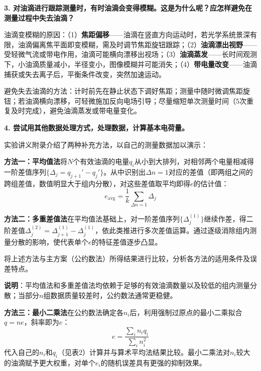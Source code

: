 \documentclass[a4paper,12pt]{article}
\begin{document}
{\vspace{0.5cm}

\textbf{3. 对油滴进行跟踪测量时，有时油滴会变得模糊。这是为什么呢？应怎样避免在测量过程中失去油滴？}

\vspace{0.2cm}

油滴变模糊的原因：（1）\textbf{焦距偏移}——油滴在竖直方向运动时，若光学系统景深有限，油滴偏离焦平面即变模糊，需及时调节焦距旋钮跟踪；（2）\textbf{油滴漂出视野}——受轻微气流或带电作用，油滴可能横向漂移出视场；（3）\textbf{油滴蒸发}——长时间观测下，小油滴质量减小，半径变小，图像模糊并可能消失；（4）\textbf{带电量改变}——油滴捕获或失去离子后，平衡条件改变，突然加速运动。

避免失去油滴的方法：计时前先在静止状态下调好焦距；测量中随时微调焦距旋钮；若油滴横向漂移，可轻微施加反向电场引导；尽量缩短单次测量时间（5次重复及时完成），避免油滴蒸发或带电量变化。

\vspace{0.5cm}

\textbf{4. 尝试用其他数据处理方式，处理数据，计算基本电荷量。}

\vspace{0.2cm}

实验讲义附录介绍了两种补充方法，以自己的测量数据加以演示：

\textbf{方法一：平均值法}\quad 将$N$个有效油滴的电量$q_i$从小到大排列，对相邻两个电量相减得一阶差值序列$\{\Delta_j = q_{j+1}' - q_j'\}$。从中识别出$\Delta n = 1$对应的差值（即两组之间的跨组差值，数值明显大于组内分散），对这些差值取平均即得$e$的估计值：
\[
e_{\text{avg}} = \frac{1}{k}\sum_{\Delta n=1} \Delta_j
\]

\textbf{方法二：多重差值法}\quad 在平均值法基础上，对一阶差值序列$\{\Delta_j^{(1)}\}$继续作差，得二阶差值$\Delta_j^{(2)} = \Delta_{j+1}^{(1)} - \Delta_j^{(1)}$，依此类推进行多次差值运算。通过逐级消除组内测量分散的影响，使代表单个$e$的特征差值逐步凸显。

将上述方法与主方案（公约数法）所得结果进行比较，分析各方法的适用条件及误差特点。

\textbf{说明}：平均值法和多重差值法均依赖于足够的有效油滴数量以及较低的组内测量分散；当部分$n$组数据质量较差时，公约数法通常更稳健。

\textbf{方法三：最小二乘法}\quad 在公约数法确定各$n_i$后，利用强制过原点的最小二乘拟合$q = ne$，斜率即为$e$：
\[
e = \frac{\sum_i n_i q_i}{\sum_i n_i^2}
\]
代入自己的$n_i$和$q_i$（见表2）计算并与算术平均法结果比较。最小二乘法对$n_i$较大的油滴赋予更大权重，对单个$e_i$的随机误差具有更强的抑制效果。

}
\end{document}
